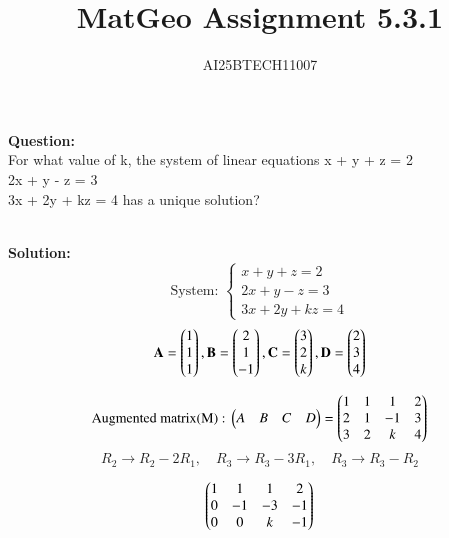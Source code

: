 \documentclass[journal]{IEEEtran}
\begin{document}

\vspace{3cm}

\title{MatGeo Assignment 5.3.1}
\author{AI25BTECH11007}
 \maketitle
{\let\newpage\relax\maketitle}

\renewcommand{\thefigure}{\theenumi}
\renewcommand{\thetable}{\theenumi}
\setlength{\intextsep}{10pt} %


\renewcommand{\thetable}{\theenumi}
\noindent
\textbf{Question:}\\
For what value of k, the system of linear equations
x + y + z = 2\\
2x + y - z = 3\\
3x + 2y + kz = 4
has a unique solution?

\noindent\\
\textbf{Solution:}\\
\[
\text{System: }
\begin{cases}
x+y+z = 2 \\
2x+y-z = 3 \\
3x+2y+kz = 4
\end{cases}
\]
\[
\mathbf A = \begin{pmatrix}1\\1\\1\end{pmatrix},
 \mathbf B = \begin{pmatrix}2\\1\\-1\end{pmatrix} ,
\mathbf C = \begin{pmatrix}3\\2\\k\end{pmatrix},
\mathbf D = \begin{pmatrix}2\\3\\4\end{pmatrix}
 \]       

\[
\text{Augmented matrix(M) : }
\begin{pmatrix}A & B & C & D\end{pmatrix} = 
\begin{pmatrix}1 & 1 & 1 & 2 \\ 2 & 1 & -1 & 3 \\ 3 & 2 & k & 4\end{pmatrix}
\]
\[
R_2 \to R_2 - 2R_1,\quad R_3 \to R_3 - 3R_1, \quad R_3 \to R_3 - R_2
\]

\[
\begin{pmatrix}1 & 1 & 1 & 2 \\ 0 & -1 & -3 & -1 \\ 0 & 0 & k & -1\end{pmatrix}
\]
\end{document}
